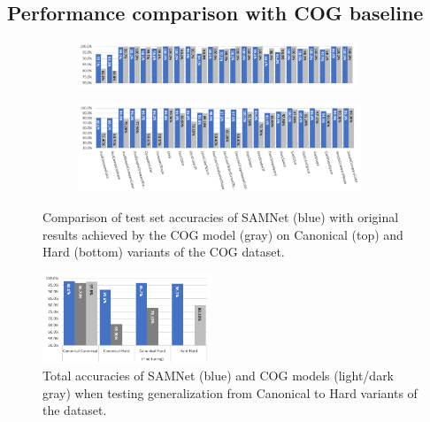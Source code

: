 \subsection{Performance comparison with COG baseline}

\begin{figure}[htbp]
	\centering
  \begin{subfigure}{\textwidth}
    \includegraphics[width=0.92\textwidth]{../results/samnet_cog_orig_canonical_no_labels.png}
  \end{subfigure}%
  \newline
  \begin{subfigure}{\textwidth}
	\includegraphics[width=0.93\textwidth]{../results/samnet_cog_orig_hard.png}
  \end{subfigure}%
\caption{Comparison of test set accuracies of SAMNet (blue) with original results achieved by the COG model (gray) on Canonical (top) and Hard (bottom) variants of the COG dataset.}
\label{fig:samnet_cog_detailed}
\end{figure}

\begin{figure}
	\centering
	\includegraphics[width=0.45\textwidth]{../results/samnet_cog_overall_transfer.png}
	\caption{Total accuracies of SAMNet (blue) and COG models (light/dark gray) when testing generalization from Canonical to Hard variants of the dataset.}
	\label{fig:samnet_cog_overall_transfer}
\end{figure}

